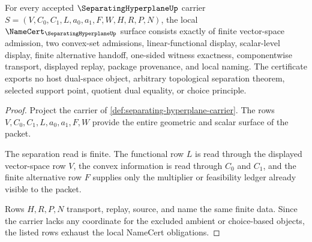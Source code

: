 \begin{theorem}
\label{thm:separating-hyperplane-namecert-obligations}
For every accepted $\SeparatingHyperplaneUp$ carrier $S=(V,C_0,C_1,L,a_0,a_1,F,W,H,R,P,N)$, the local $\NameCert_{\SeparatingHyperplaneUp}$ surface consists exactly of finite vector-space admission, two convex-set admissions, linear-functional display, scalar-level display, finite alternative handoff, one-sided witness exactness, componentwise transport, displayed replay, package provenance, and local naming. The certificate exports no host dual-space object, arbitrary topological separation theorem, selected support point, quotient dual equality, or choice principle.
\end{theorem}
\begin{proof}
Project the carrier of \autoref{def:separating-hyperplane-carrier}. The rows $V,C_0,C_1,L,a_0,a_1,F,W$ provide the entire geometric and scalar surface of the packet.

The separation read is finite. The functional row $L$ is read through the displayed vector-space row $V$, the convex information is read through $C_0$ and $C_1$, and the finite alternative row $F$ supplies only the multiplier or feasibility ledger already visible to the packet.

Rows $H,R,P,N$ transport, replay, source, and name the same finite data. Since the carrier lacks any coordinate for the excluded ambient or choice-based objects, the listed rows exhaust the local NameCert obligations.
\end{proof}

